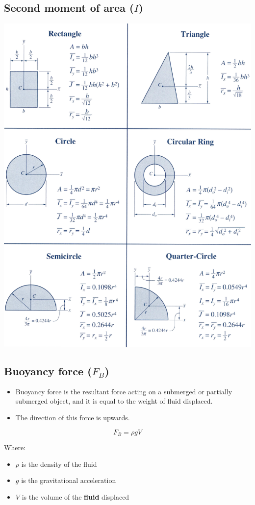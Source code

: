 \documentclass[11pt]{article}
\begin{document}
\subsection{Second moment of area (\(I\))}
\label{sec:org0d7b012}
\begin{center}
\includegraphics[width=.9\linewidth]{./images/second-moment-of-area.png}
\end{center}

\newpage
\subsection{Buoyancy force (\(F_B\))}
\label{sec:orgc06d8fd}
\begin{itemize}
\item Buoyancy force is the resultant force acting on a submerged or partially submerged object, and it is equal to the weight of fluid displaced.
\item The direction of this force is upwards.
\end{itemize}

\[F_B = \rho g V\]

Where:
\begin{itemize}
\item \(\rho\) is the density of the fluid
\item \(g\) is the gravitational acceleration
\item \(V\) is the volume of the \textbf{fluid} displaced
\end{itemize}
\end{document}
